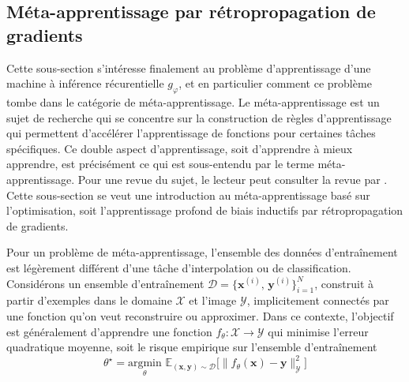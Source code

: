 \subsection{Méta-apprentissage par rétropropagation de gradients}

Cette sous-section s'intéresse finalement au problème d'apprentissage d'une machine à inférence récurentielle $g_\varphi$, 
et en particulier comment ce problème tombe dans le catégorie de méta-apprentissage.
Le méta-apprentissage est un sujet de recherche qui se concentre sur la construction de règles d'apprentissage qui permettent 
d'accélérer l'apprentissage de fonctions pour certaines tâches spécifiques. Ce double aspect d'apprentissage, soit d'apprendre à mieux 
apprendre, est précisément ce qui est sous-entendu par le terme méta-apprentissage. Pour une revue du sujet, le lecteur peut consulter 
la revue par \citet{Hospedales2020}. Cette sous-section se veut une introduction au méta-apprentissage basé sur l'optimisation,
soit l'apprentissage profond de biais inductifs par rétropropagation de gradients.

Pour un problème de méta-apprentissage, l'ensemble des données d'entraînement est légèrement différent d'une tâche d'interpolation ou de classification. 
Considérons un ensemble d'entraînement $\mathcal{D} = \{\mathbf{x}^{(i)},\,\mathbf{y}^{(i)}\}_{i=1}^{N}$, 
construit à partir d'exemples dans le domaine $\mathcal{X}$ et l'image $\mathcal{Y}$, implicitement connectés par une fonction qu'on veut reconstruire ou 
approximer. Dans ce contexte, l'objectif est généralement d'apprendre une fonction $f_\theta: \mathcal{X} \rightarrow \mathcal{Y}$ 
qui minimise l'erreur quadratique moyenne, soit le risque empirique sur l'ensemble d'entraînement
\begin{equation}\label{eq:Regression}
        \theta^{\star} = \underset{\theta}{\mathrm{argmin}}\,\, 
        \mathbb{E}_{(\mathbf{x},\mathbf{y}) \sim \mathcal{D}} \bigg[ \big\lVert f_\theta(\mathbf{x}) - \mathbf{y} \big\rVert^{2}_{\mathcal{Y}}  \bigg]
\end{equation} 

